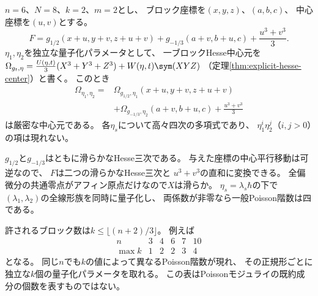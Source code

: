 \begin{example}[共通中心変数を持つ六次元cubicと独立な二方向]
\label{ex:pg-ad-sixfold}
$n=6$、$N=8$、$k=2$、$m=2$とし、
ブロック座標を$(x,y,z)$、$(a,b,c)$、
中心座標を$(u,v)$とする。
\begin{equation}
 F=
 g_{1/2}(x+u,y+v,z+u+v)
 +g_{-1/3}(a+v,b+u,c)
 +\frac{u^3+v^3}{3}.
\end{equation}
$\eta_1,\eta_2$を独立な量子化パラメータとして、
一ブロックHesse中心元を
$\Omega_{g_t,\eta}=\frac{U(\eta,t)}3(X^3+Y^3+Z^3)
 +W(\eta,t)\sym(XYZ)$
（定理\ref{thm:explicit-hesse-center}）と書く。
このとき
\begin{equation}
\begin{split}
\Omega_{\eta_1,\eta_2}={}&
 \Omega_{g_{1/2},\eta_1}(x+u,y+v,z+u+v)\\
 &+\Omega_{g_{-1/3},\eta_2}(a+v,b+u,c)
 +\frac{u^3+v^3}{3}
\end{split}
\end{equation}
は厳密な中心元である。
各$\eta_s$について高々四次の多項式であり、
$\eta_1^i\eta_2^j$（$i,j>0$）の項は現れない。

$g_{1/2}$と$g_{-1/3}$はともに滑らかなHesse三次である。
与えた座標の中心平行移動は可逆なので、
$F$は二つの滑らかなHesse三次と
$u^3+v^3$の直和に変換できる。
全偏微分の共通零点がアフィン原点だけなので$X$は滑らか。
$\eta_s=\lambda_s\hbar$の下で
$(\lambda_1,\lambda_2)$の全線形族を同時に量子化し、
両係数が非零なら一般Poisson階数は四である。
\end{example}

\begin{remark}[次元と独立パラメータ数]
\label{rem:pg-ad-dimension-table}
許されるブロック数は$k\le\lfloor(n+2)/3\rfloor$。
例えば
\begin{equation}
\begin{array}{c|ccccc}
 n&3&4&6&7&10\\ \hline
 \max k&1&2&2&3&4
\end{array}
\end{equation}
となる。
同じ$n$でも$k$の値によって異なるPoisson階数が現れ、
その正規形ごとに独立な$k$個の量子化パラメータを取れる。
この表はPoissonモジュライの既約成分の個数を表すものではない。
\end{remark}

